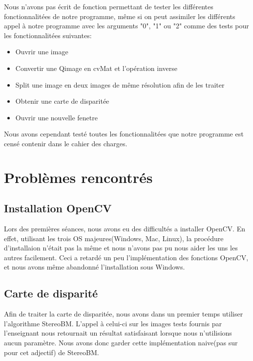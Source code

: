 \documentclass[a4paper]{article}
\begin{document}
Nous n'avons pas écrit de fonction permettant de tester les différentes fonctionnalitées de notre programme, même si on peut assimiler les différents appel à notre programme avec les arguments "0", "1" ou "2" comme des tests pour les fonctionnalitées suivantes:
\begin{itemize}
\item Ouvrir une image
\item Convertir une Qimage en cvMat et l'opération inverse
\item Split une image en deux images de même résolution afin de les traiter
\item Obtenir une carte de disparitée
\item Ouvrir une nouvelle fenetre

\end{itemize}


Nous avons cependant testé toutes les fonctionnalitées que notre programme est censé contenir dans le cahier des charges.


\section{Problèmes rencontrés}


\subsection*{Installation OpenCV}

Lors des premières séances, nous avons eu des difficultés a installer OpenCV. En effet, utilisant les trois OS majeures(Windows, Mac, Linux), la procédure d'installaion n'était pas la même et nous n'avons pas pu nous aider les uns les autres facilement. Ceci a retardé un peu l'implémentation des fonctions OpenCV, et nous avons même abandonné l'installation sous Windows.

\subsection*{Carte de disparité}

Afin de traiter la carte de disparitée, nous avons dans un premier temps utiliser l'algorithme StereoBM. L'appel à celui-ci sur les images tests fournis par l'enseignant nous retournait un résultat satisfaisant lorsque nous n'utilisions aucun paramètre. Nous avons donc garder cette implémentation naive(pas sur pour cet adjectif) de StereoBM.
\end{document}
